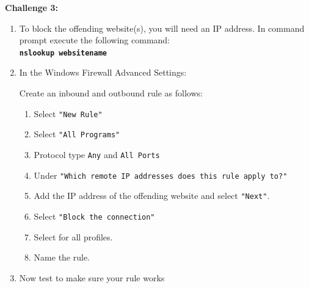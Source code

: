 \documentclass[12pt]{extarticle}
\newcommand{\ben}{\begin{enumerate}}
\newcommand{\een}{\end{enumerate}}
\begin{document}
\vspace{4mm}
\item \textbf{Challenge 3:}
\begin{enumerate}
\item To block the offending website(s), you will need an IP address. In command prompt execute the following command:\\
\texttt{\textbf{nslookup {websitename} } }
\item In the Windows Firewall Advanced Settings:

  Create an inbound and outbound rule as follows:
	\ben
    \item Select \texttt{"New Rule"}
    \item Select \texttt{"All Programs"}
    \item Protocol type \texttt{Any} and \texttt{All Ports}
    \item Under \texttt{"Which remote IP addresses does this rule apply to?" }
    \item Add the IP address of the offending website and select \texttt{"Next"}.
    \item Select \texttt{"Block the connection"}
    \item Select for all profiles.
    \item Name the rule.
  \een
\item Now test to make sure your rule works
\end{enumerate}
\end{document}
